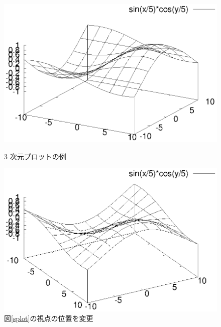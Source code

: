 \documentclass[a4j]{ujarticle} %
\begin{document}
\begin{figure}
\begin{minipage}[bhtp]{0.49\textwidth}
\includegraphics[width=\hsize]{splot.eps}
\caption{3 次元プロットの例}
\label{splot}
\end{minipage}
\begin{minipage}[bhtp]{0.49\textwidth}
\includegraphics[width=\hsize]{view.eps}
\caption{図\ref{splot}の視点の位置を変更}
\label{view}
\end{minipage}
\end{figure}
\end{document}
